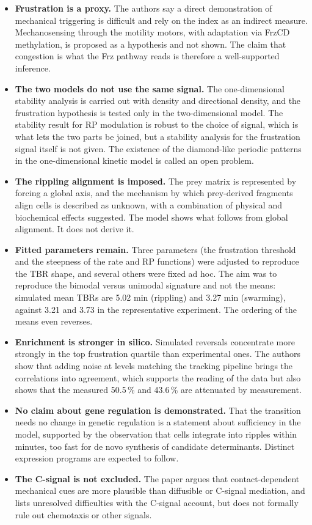 \documentclass[11pt]{article}
\theoremstyle{definition}
\theoremstyle{remark}
\begin{document}
\begin{itemize}[leftmargin=1.6em,itemsep=2pt]
  \item \textbf{Frustration is a proxy.} The authors say a direct demonstration of mechanical triggering is difficult and rely on the index as an indirect measure. Mechanosensing through the motility motors, with adaptation via FrzCD methylation, is proposed as a hypothesis and not shown. The claim that congestion is what the Frz pathway reads is therefore a well-supported inference.
  \item \textbf{The two models do not use the same signal.} The one-dimensional stability analysis is carried out with density and directional density, and the frustration hypothesis is tested only in the two-dimensional model. The stability result for RP modulation is robust to the choice of signal, which is what lets the two parts be joined, but a stability analysis for the frustration signal itself is not given. The existence of the diamond-like periodic patterns in the one-dimensional kinetic model is called an open problem.
  \item \textbf{The rippling alignment is imposed.} The prey matrix is represented by forcing a global axis, and the mechanism by which prey-derived fragments align cells is described as unknown, with a combination of physical and biochemical effects suggested. The model shows what follows from global alignment. It does not derive it.
  \item \textbf{Fitted parameters remain.} Three parameters (the frustration threshold and the steepness of the rate and RP functions) were adjusted to reproduce the TBR shape, and several others were fixed ad hoc. The aim was to reproduce the bimodal versus unimodal signature and not the means: simulated mean TBRs are 5.02 min (rippling) and 3.27 min (swarming), against 3.21 and 3.73 in the representative experiment. The ordering of the means even reverses.
  \item \textbf{Enrichment is stronger in silico.} Simulated reversals concentrate more strongly in the top frustration quartile than experimental ones. The authors show that adding noise at levels matching the tracking pipeline brings the correlations into agreement, which supports the reading of the data but also shows that the measured 50.5\,\% and 43.6\,\% are attenuated by measurement.
  \item \textbf{No claim about gene regulation is demonstrated.} That the transition needs no change in genetic regulation is a statement about sufficiency in the model, supported by the observation that cells integrate into ripples within minutes, too fast for de novo synthesis of candidate determinants. Distinct expression programs are expected to follow.
  \item \textbf{The C-signal is not excluded.} The paper argues that contact-dependent mechanical cues are more plausible than diffusible or C-signal mediation, and lists unresolved difficulties with the C-signal account, but does not formally rule out chemotaxis or other signals.
\end{itemize}
\end{document}
